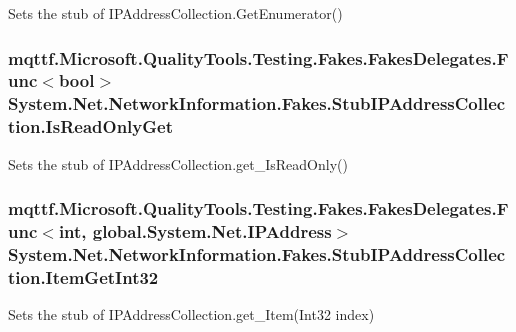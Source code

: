 Sets the stub of I\-P\-Address\-Collection.\-Get\-Enumerator()

\hypertarget{class_system_1_1_net_1_1_network_information_1_1_fakes_1_1_stub_i_p_address_collection_ae05d8bb79a96ae985b19c8db49c64a2d}{
\subsubsection[{Is\-Read\-Only\-Get}]{\setlength{\rightskip}{0pt plus 5cm}mqttf.\-Microsoft.\-Quality\-Tools.\-Testing.\-Fakes.\-Fakes\-Delegates.\-Func$<$bool$>$ System.\-Net.\-Network\-Information.\-Fakes.\-Stub\-I\-P\-Address\-Collection.\-Is\-Read\-Only\-Get}}\label{class_system_1_1_net_1_1_network_information_1_1_fakes_1_1_stub_i_p_address_collection_ae05d8bb79a96ae985b19c8db49c64a2d}


Sets the stub of I\-P\-Address\-Collection.\-get\-\_\-\-Is\-Read\-Only()

\hypertarget{class_system_1_1_net_1_1_network_information_1_1_fakes_1_1_stub_i_p_address_collection_af837a9f64b96301fafc3507eedecb678}{
\subsubsection[{Item\-Get\-Int32}]{\setlength{\rightskip}{0pt plus 5cm}mqttf.\-Microsoft.\-Quality\-Tools.\-Testing.\-Fakes.\-Fakes\-Delegates.\-Func$<$int, global.\-System.\-Net.\-I\-P\-Address$>$ System.\-Net.\-Network\-Information.\-Fakes.\-Stub\-I\-P\-Address\-Collection.\-Item\-Get\-Int32}}\label{class_system_1_1_net_1_1_network_information_1_1_fakes_1_1_stub_i_p_address_collection_af837a9f64b96301fafc3507eedecb678}


Sets the stub of I\-P\-Address\-Collection.\-get\-\_\-\-Item(\-Int32 index)

